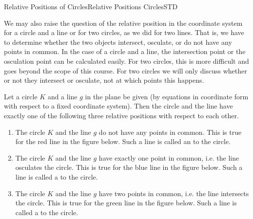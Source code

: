 \begin{MXContent}{Relative Positions of Circles}{Relative Positions Circles}{STD}

We may also raise the question of the relative position in the coordinate system for a circle and a line or for two circles, 
as we did for two lines. That is, we have to determine whether the two objects intersect, osculate, or do not 
have any points in common. In the case of a circle and a line, the intersection point or the osculation point can be 
calculated easily. For two circles, this is more difficult and goes beyond the scope of this course. For two 
circles we will only discuss whether or not they intersect or osculate, not at which points this happens.

\begin{MInfo}
Let a circle $K$ and a line $g$ in the plane be given 
(by equations in coordinate form with respect to a fixed coordinate system). Then the circle and the line 
have exactly one of the following three relative positions with respect to each other.
\begin{enumerate}
 \item The circle $K$ and the line $g$ do not have any points in common. This is true for the red line in the figure below. 
  Such a line is called an  to the circle.
 \item The circle $K$ and the line $g$ have exactly one point in common, i.e. the line osculates the circle. 
  This is true for the blue line in the figure below. Such a line is called a  to the circle.
 \item The circle $K$ and the line $g$ have two points in common, i.e. the line intersects the circle. 
  This is true for the green line in the figure below. Such a line is called a  to the circle.
\end{enumerate}
\begin{center}
\end{center} 
\end{MInfo}


\end{MXContent}
